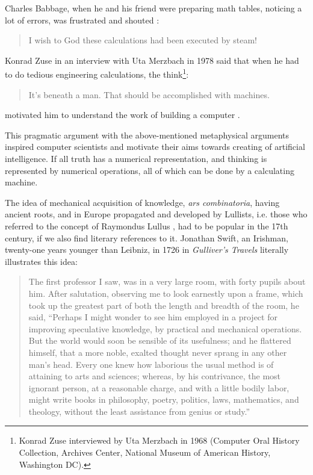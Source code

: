 \documentclass[pdftex,12pt]{article}
\begin{document}
Charles Babbage, when he and his friend were preparing math tables, noticing a lot of errors, was frustrated and shouted \parencite{Swade2002}: \begin{quote} \small I wish to God these calculations had been executed by steam! \end{quote} Konrad Zuse in an interview with Uta Merzbach in 1978 said that when he had to do tedious engineering calculations, the think\footnote{Konrad Zuse interviewed by Uta Merzbach in 1968 (Computer Oral History Collection, Archives Center, National Museum of American History, Washington DC).}: \begin{quote} \small It's beneath a man. That should be accomplished with machines. \end{quote} motivated him to understand the work of building a computer \parencite[p.449]{CopelandSprevakShagrir2017}.

This pragmatic argument with the above-mentioned metaphysical arguments inspired computer scientists and motivate their aims   towards creating of artificial intelligence.
If all truth has a numerical representation, and thinking is represented by numerical operations, all of which can be done by a calculating machine.

The idea of mechanical acquisition of knowledge, \emph{ars combinatoria}, having ancient roots, and in Europe propagated and developed by Lullists, i.e. those who referred to the concept of Raymondus Lullus \parencite{Trzesicki2020,Trzesicki2020a}, had to be popular in the 17th century, if we also find literary references to it. Jonathan Swift, an Irishman, twenty-one years younger than Leibniz, in 1726 in \emph{Gulliver's Travels} \parencite*{Swift1892} literally illustrates this idea: \begin{quote} \small The first professor I saw, was in a very large room, with forty pupils about him. After salutation, observing me to look earnestly upon a frame, which took up the greatest part of both the length and breadth of the room, he said, ``Perhaps I might wonder to see him employed in a project for improving speculative knowledge, by practical and mechanical operations. But the world would soon be sensible of its usefulness; and he flattered himself, that a more noble, exalted thought never sprang in any other man's head. Every one knew how laborious the usual method is of attaining to arts and sciences; whereas, by his contrivance, the most ignorant person, at a reasonable charge, and with a little bodily labor, might write books in philosophy, poetry, politics, laws, mathematics, and theology, without the least assistance from genius or study.'' \end{quote}
\end{document}
